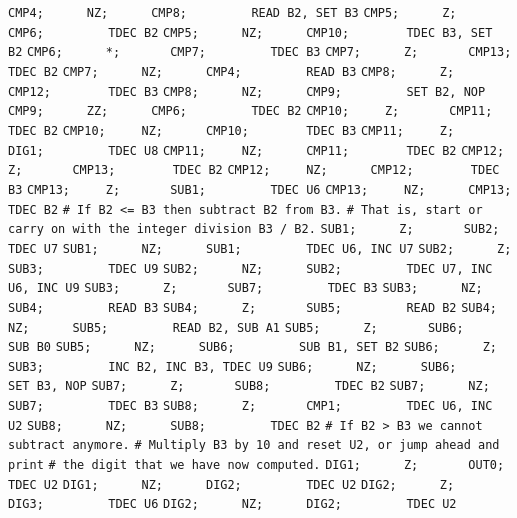 \begin{apgsembly}
\begin{minipage}[t]{.49\textwidth}
\begin{algorithmic}
			\State \verb|CMP4;      NZ;      CMP8;         READ B2, SET B3|
			\State \verb|CMP5;      Z;       CMP6;         TDEC B2|
			\State \verb|CMP5;      NZ;      CMP10;        TDEC B3, SET B2|
			\State \verb|CMP6;      *;       CMP7;         TDEC B3|
			\State \verb|CMP7;      Z;       CMP13;        TDEC B2|
			\State \verb|CMP7;      NZ;      CMP4;         READ B3|
			\State \verb|CMP8;      Z;       CMP12;        TDEC B3|
			\State \verb|CMP8;      NZ;      CMP9;         SET B2, NOP|
			\State \verb|CMP9;      ZZ;      CMP6;         TDEC B2|
			\State \verb|CMP10;     Z;       CMP11;        TDEC B2|
			\State \verb|CMP10;     NZ;      CMP10;        TDEC B3|
			\State \verb|CMP11;     Z;       DIG1;         TDEC U8|
			\State \verb|CMP11;     NZ;      CMP11;        TDEC B2|
			\State \verb|CMP12;     Z;       CMP13;        TDEC B2|
			\State \verb|CMP12;     NZ;      CMP12;        TDEC B3|
			\State \verb|CMP13;     Z;       SUB1;         TDEC U6|
			\State \verb|CMP13;     NZ;      CMP13;        TDEC B2|
			\State \verb||
			\State \verb|# If B2 <= B3 then subtract B2 from B3.|
			\State \verb|# That is, start or carry on with the integer division B3 / B2.|
			\State \verb|SUB1;      Z;       SUB2;         TDEC U7|
			\State \verb|SUB1;      NZ;      SUB1;         TDEC U6, INC U7|
			\State \verb|SUB2;      Z;       SUB3;         TDEC U9|
			\State \verb|SUB2;      NZ;      SUB2;         TDEC U7, INC U6, INC U9|
			\State \verb|SUB3;      Z;       SUB7;         TDEC B3|
			\State \verb|SUB3;      NZ;      SUB4;         READ B3|
			\State \verb|SUB4;      Z;       SUB5;         READ B2|
			\State \verb|SUB4;      NZ;      SUB5;         READ B2, SUB A1|
			\State \verb|SUB5;      Z;       SUB6;         SUB B0|
			\State \verb|SUB5;      NZ;      SUB6;         SUB B1, SET B2|
			\State \verb|SUB6;      Z;       SUB3;         INC B2, INC B3, TDEC U9|
			\State \verb|SUB6;      NZ;      SUB6;         SET B3, NOP|
			\State \verb|SUB7;      Z;       SUB8;         TDEC B2|
			\State \verb|SUB7;      NZ;      SUB7;         TDEC B3|
			\State \verb|SUB8;      Z;       CMP1;         TDEC U6, INC U2|
			\State \verb|SUB8;      NZ;      SUB8;         TDEC B2|
			\State \verb||
			\State \verb|# If B2 > B3 we cannot subtract anymore.|
			\State \verb|# Multiply B3 by 10 and reset U2, or jump ahead and print|
			\State \verb|# the digit that we have now computed.|
			\State \verb|DIG1;      Z;       OUT0;         TDEC U2|
			\State \verb|DIG1;      NZ;      DIG2;         TDEC U2|
			\State \verb|DIG2;      Z;       DIG3;         TDEC U6|
			\State \verb|DIG2;      NZ;      DIG2;         TDEC U2|

\end{algorithmic}
\end{minipage}
\end{apgsembly}
